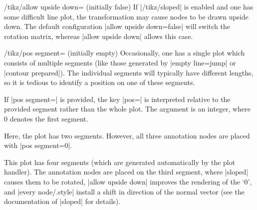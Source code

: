 \begin{key}{/tikz/allow upside down= (initially false)}
	If |/tikz/sloped| is enabled and one has some difficult line plot, the transformation may cause nodes to be drawn upside down. The default configuration |allow upside down=false| will switch the rotation matrix, whereas |allow upside down| allows this case.
\end{key}

\begin{key}{/tikz/pos segment= (initially empty)}
	Occasionally, one has a single plot which consists of multiple segments (like those generated by |empty line=jump| or |contour prepared|). The individual segments will typically have different lengths, so it is tedious to identify a position on one of these segments.

	If |pos segment=| is provided, the key |pos=| is interpreted relative to the provided segment rather than the whole plot. The argument  is an integer, where $0$ denotes the first segment.
\begin{codeexample}[]
\end{codeexample}
	Here, the plot has two segments. However, all three annotation nodes are placed with |pos segment=0|.

\begin{codeexample}[]
\end{codeexample}
	This plot has four segments (which are generated automatically by the plot handler). The annotation nodes are placed
	on the third segment, where |sloped| causes them to be rotated, |allow upside down| improves the rendering of the `$0$', and |every node/.style| install a shift in direction of the normal vector (see the documentation of |sloped| for details).
\end{key}

